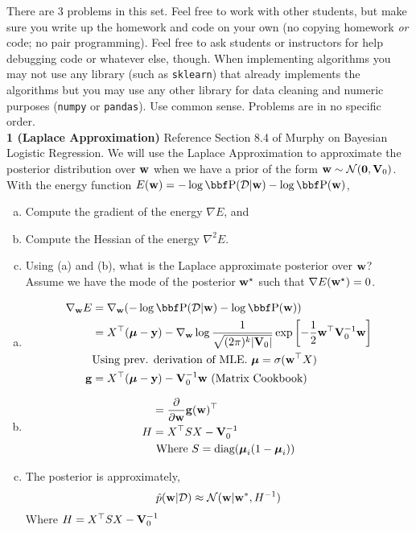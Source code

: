 \documentclass[12pt,letterpaper,fleqn]{hmcpset}
\begin{document}
There are 3 problems in this set.
Feel free to work with other students, but make sure you write up the homework
and code on your own (no copying homework \textit{or} code; no pair programming).
Feel free to ask students or instructors for help debugging code or whatever else,
though.
When implementing algorithms you may not use any library (such as \texttt{sklearn})
that already implements the algorithms but you may use any other library for
data cleaning and numeric purposes (\texttt{numpy} or \texttt{pandas}). Use common
sense. Problems are in no specific order.\\[1em]

\textbf{1 (Laplace Approximation)} Reference Section 8.4 of Murphy on Bayesian Logistic Regression. We will
use the Laplace Approximation to approximate the posterior distribution over
${\bf w}$ when we have a prior of the form ${\bf w} \sim {\cal N}({\bf 0}, {\bf V}_0)$. With the energy
function $E(\ww) = -\log\PP(\Dc|\ww) - \log\PP(\ww)$,
\begin{enumerate}[(a)]
    \item Compute the gradient of the energy $\nabla E$, and
    \item Compute the Hessian of the energy $\nabla^2 E$.
    \item Using (a) and (b), what is the Laplace approximate posterior over
        ${\bf w}$? Assume we have the mode of the posterior ${\bf w}^\star$ such
        that $\nabla E({\bf w}^\star) = 0$.
\end{enumerate}
    \begin{enumerate}[(a)]
        \item
            \begin{align*}
                 \nabla_\ww E &= \nabla_\ww (-\log\PP(\Dc|\ww) - \log\PP(\ww)) \\
                 &=  X^\T(\mub-\yy) - \nabla_\ww\log \frac{1}{\sqrt{(2\pi)^k|\Vb_0|}} \exp \left[-\frac12 \ww^\T \Vb_0^{-1} \ww \right]\\ &\text{Using prev. derivation of MLE. $\mub = \sigma(\ww^\T X)$}\\
                 \gg &= X^\T(\mub-\yy) - \Vb_0^{-1} \ww \text{ (Matrix Cookbook)}\\
             \end{align*} 
        \item
           \begin{align*}
                &= \frac\partial{\partial {\bf w}} {\bf g}({\bf w})^\top \\
                H &=  X^\top S X - {\bf V}_0^{-1} \\
                & \text{ Where $S = {\hbox{diag}}(\hbox{\boldmath$\mu$}_i(1-\hbox{\boldmath$\mu$}_i))$} \\
            \end{align*}
        \item
        	The posterior is approximately,
        	$$
        		\hat{p}({\bf w}|{\cal D}) \approx {\cal N} ({\bf w}|{\bf w}^*, H^{-1})
        	$$
        	Where $H = X^\top S X - {\bf V}_0^{-1}$
    \end{enumerate}
\begin{solution}
    
\end{solution}
\end{document}
